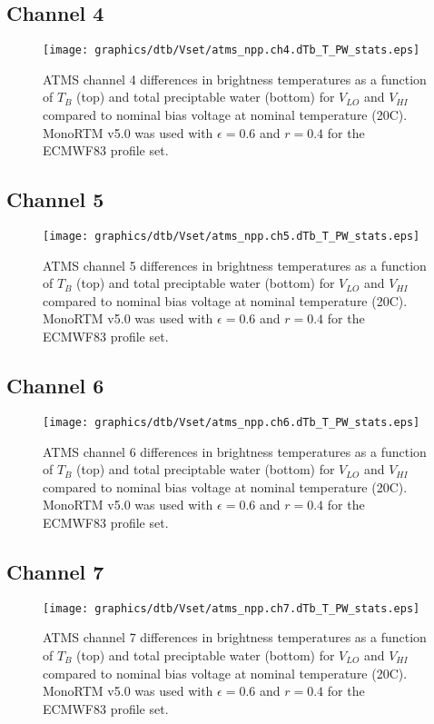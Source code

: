 \subsection{Channel 4}
\begin{figure}[H]
  \label{fig:Vset.ch4_dtb}
  \centering
  \hspace{1.5cm}\texttt{[image: graphics/dtb/Vset/atms\_npp.ch4.dTb\_T\_PW\_stats.eps]}
  \caption{ATMS channel 4 differences in brightness temperatures as a function of $T_B$ (top) and total preciptable water (bottom) for $V_{LO}$ and $V_{HI}$ compared to nominal bias voltage at nominal temperature (20\textdegree{}C). MonoRTM v5.0 was used with $\epsilon=0.6$ and $r=0.4$ for the ECMWF83 profile set.}
\end{figure}

\subsection{Channel 5}
\begin{figure}[H]
  \label{fig:Vset.ch5_dtb}
  \centering
  \hspace{1.5cm}\texttt{[image: graphics/dtb/Vset/atms\_npp.ch5.dTb\_T\_PW\_stats.eps]}
  \caption{ATMS channel 5 differences in brightness temperatures as a function of $T_B$ (top) and total preciptable water (bottom) for $V_{LO}$ and $V_{HI}$ compared to nominal bias voltage at nominal temperature (20\textdegree{}C). MonoRTM v5.0 was used with $\epsilon=0.6$ and $r=0.4$ for the ECMWF83 profile set.}
\end{figure}

\subsection{Channel 6}
\begin{figure}[H]
  \label{fig:Vset.ch6_dtb}
  \centering
  \hspace{1.5cm}\texttt{[image: graphics/dtb/Vset/atms\_npp.ch6.dTb\_T\_PW\_stats.eps]}
  \caption{ATMS channel 6 differences in brightness temperatures as a function of $T_B$ (top) and total preciptable water (bottom) for $V_{LO}$ and $V_{HI}$ compared to nominal bias voltage at nominal temperature (20\textdegree{}C). MonoRTM v5.0 was used with $\epsilon=0.6$ and $r=0.4$ for the ECMWF83 profile set.}
\end{figure}

\subsection{Channel 7}
\begin{figure}[H]
  \label{fig:Vset.ch7_dtb}
  \centering
  \hspace{1.5cm}\texttt{[image: graphics/dtb/Vset/atms\_npp.ch7.dTb\_T\_PW\_stats.eps]}
  \caption{ATMS channel 7 differences in brightness temperatures as a function of $T_B$ (top) and total preciptable water (bottom) for $V_{LO}$ and $V_{HI}$ compared to nominal bias voltage at nominal temperature (20\textdegree{}C). MonoRTM v5.0 was used with $\epsilon=0.6$ and $r=0.4$ for the ECMWF83 profile set.}
\end{figure}

